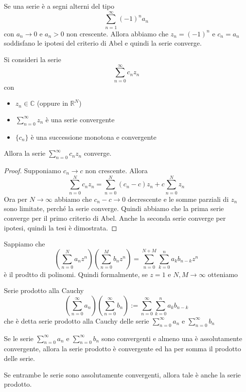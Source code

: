 \begin{corollary}
    Se una serie è a segni alterni del tipo 
    \[
        \sum_{n=1}^{\infty} {(-1)}^{n} a_{n}
    \]
    con \(a_{n} \to 0\) e \(a_{n} > 0\) non crescente. Allora abbiamo che
    \(z_{n} = {(-1)}^{n}\) e \(c_{n} = a_{n}\) soddisfano le ipotesi del
    criterio di Abel e quindi la serie converge.
\end{corollary}
\begin{theorem}
    Si consideri la serie \[
        \sum_{n=0}^{\infty} c_{n} z_{n} 
    \]
    con
    \begin{itemize}
        \item \(z_{n} \in \mathbb{C}\) (oppure in \(\mathbb{R}^{N}\))
        \item \(\sum_{n=0}^{\infty} z_{n}\) è una serie convergente
        \item \(\{c_{n}\}\) è una successione monotona e convergente
    \end{itemize}
    Allora la serie \(\sum_{n=0}^{\infty} c_{n} z_{n}\) converge.
\end{theorem}
\begin{proof}
    Supponiamo \(c_{n} \to c\) non crescente. Allora
    \[
        \sum_{n=0}^{N} c_{n} z_{n} = \sum_{n=0}^{N} (c_{n} - c)z_{n} + c
        \sum_{n=0}^{N} z_{n}
    \]
    Ora per \(N \to \infty\) abbiamo che \(c_{n} - c \to 0\) decrescente e le
    somme parziali di \(z_{n}\) sono limitate, perché la serie converge. Quindi
    abbiamo che la prima serie converge per il primo criterio di Abel. 
    Anche la seconda serie converge per ipotesi, quindi la tesi è dimostrata.
\end{proof}

Sappiamo che 
\[
    \left( \sum_{n=0}^{N} a_{n} z^{n}  \right) \left( \sum_{n=0}^{M}
        b_{n} z^{n}
    \right) = \sum_{n=0}^{N+M} \sum_{k=0}^{n} a_{k} b_{n-k}  z^{n}
\]
è il prodtto di polinomi. Quindi formalmente, se \(z = 1\) e \(N, M \to \infty\) otteniamo

\begin{definition}{Serie prodotto alla Cauchy}
\[
    \left( \sum_{n=0}^{\infty} a_{n}  \right) \left( \sum_{n=0}^{\infty} b_{n}
    \right) := \sum_{n=0}^{\infty} \sum_{k=0}^{n} a_{k} b_{n-k}  
\]
che è detta serie prodotto alla Cauchy delle serie \(\sum_{n=0}^{\infty} a_{n}\)
e \(\sum_{n=0}^{\infty} b_{n} \) 
\end{definition}

\begin{theorem}
    Se le serie \(\sum_{n=0}^{\infty} a_{n}\) e \(\sum_{n=0}^{\infty} b_{n} \)
    sono convergenti e almeno una è assolutamente convergente, allora la serie
    prodotto è convergente ed ha per somma il prodotto delle serie.
    
    Se entrambe le serie sono assolutamente convergenti, allora tale è anche la
    serie prodotto.
\end{theorem}

